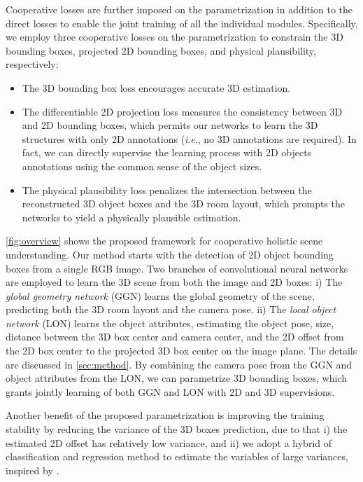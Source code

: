 \documentclass{article}
\makeatletter
\newcommand{\ie}{\textit{i}.\textit{e}.\@\xspace}
\makeatother
\begin{document}
Cooperative losses are further imposed on the parametrization in addition to the direct losses to enable the joint training of all the individual modules. Specifically, we employ three cooperative losses on the parametrization to constrain the 3D bounding boxes, projected 2D bounding boxes, and physical plausibility, respectively:
\begin{itemize}[leftmargin=*,noitemsep,nolistsep]
    \item The 3D bounding box loss encourages accurate 3D estimation.
    \item The differentiable 2D projection loss measures the consistency between 3D and 2D bounding boxes, which permits our networks to learn the 3D structures with only 2D annotations (\ie, no 3D annotations are required). In fact, we can directly supervise the learning process with 2D objects annotations using the common sense of the object sizes.
    \item The physical plausibility loss penalizes the intersection between the reconstructed 3D object boxes and the 3D room layout, which prompts the networks to yield a physically plausible estimation.
\end{itemize}

\autoref{fig:overview} shows the proposed framework for cooperative holistic scene understanding. Our method starts with the detection of 2D object bounding boxes from a single RGB image. Two branches of convolutional neural networks are employed to learn the 3D scene from both the image and 2D boxes: i) The \emph{global geometry network} (GGN) learns the global geometry of the scene, predicting both the 3D room layout and the camera pose. ii) The \emph{local object network} (LON) learns the object attributes, estimating the object pose, size, distance between the 3D box center and camera center, and the 2D offset from the 2D box center to the projected 3D box center on the image plane. The details are discussed in \autoref{sec:method}. By combining the camera pose from the GGN and object attributes from the LON, we can parametrize 3D bounding boxes, which grants jointly learning of both GGN and LON with 2D and 3D supervisions.

Another benefit of the proposed parametrization is improving the training stability by reducing the variance of the 3D boxes prediction, due to that i) the estimated 2D offset has relatively low variance, and ii) we adopt a hybrid of classification and regression method to estimate the variables of large variances, inspired by \citep{ren2015faster,mousavian20173d,qi2017frustum}.
\end{document}
